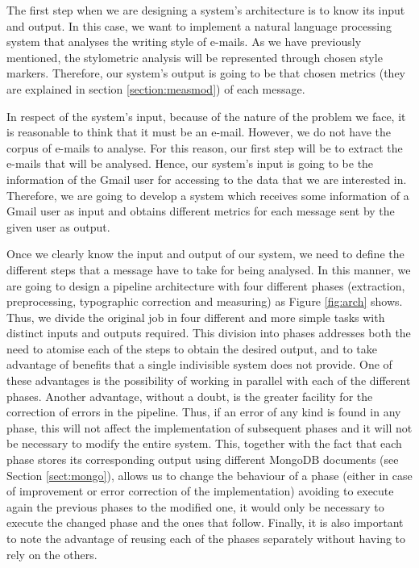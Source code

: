 The first step when we are designing a system's architecture is to know its input and output. In this case, we want to implement a natural language processing system that analyses the writing style of e-mails. As we have previously mentioned, the stylometric analysis will be represented through chosen style markers. Therefore, our system's output is going to be that chosen metrics (they are explained in section \ref{section:measmod}) of each message.

In respect of the system's input, because of the nature of the problem we face, it is reasonable to think that it must be an e-mail. However, we do not have the corpus of e-mails to analyse. For this reason, our first step will be to extract the e-mails that will be analysed. Hence, our system's input is going to be the information of the Gmail user for accessing to the data that we are interested in. Therefore, we are going to develop a system which receives some information of a Gmail user as input and obtains different metrics for each message sent by the given user as output.

Once we clearly know the input and output of our system, we need to define the different steps that a message have to take for being analysed. In this manner, we are going to design a pipeline architecture with four different phases (extraction, preprocessing, typographic correction and measuring) as Figure \ref{fig:arch} shows. Thus, we divide the original job in four different and more simple tasks with distinct inputs and outputs required. This division into phases addresses both the need to atomise each of the steps to obtain the desired output, and to take advantage of benefits that a single indivisible system does not provide. One of these advantages is the possibility of working in parallel with each of the different phases. Another advantage, without a doubt, is the greater facility for the correction of errors in the pipeline. Thus, if an error of any kind is found in any phase, this will not affect the implementation of subsequent phases and it will not be necessary to modify the entire system. This, together with the fact that each phase stores its corresponding output using different MongoDB documents (see Section \ref{sect:mongo}), allows us to change the behaviour of a phase (either in case of improvement or error correction of the implementation) avoiding to execute again the previous phases to the modified one, it would only be necessary to execute the changed phase and the ones that follow. Finally, it is also important to note the advantage of reusing each of the phases separately without having to rely on the others.

